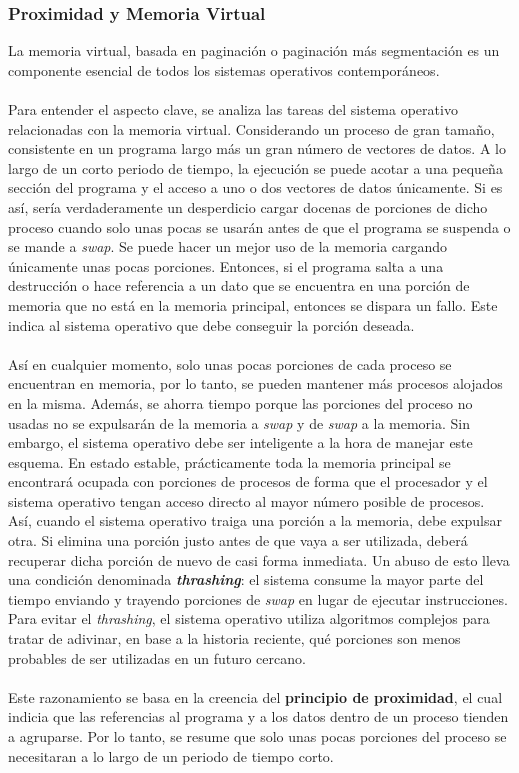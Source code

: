 \documentclass[12pt,a4paper]{article}
\begin{document}
 \subsubsection{Proximidad y Memoria Virtual}
La memoria virtual, basada en paginación o paginación más segmentación es un componente esencial de todos los sistemas operativos contemporáneos.\\\\ 
Para entender el aspecto clave, se analiza las tareas del sistema operativo relacionadas con la memoria virtual. Considerando un proceso de gran tamaño, consistente en un programa largo más un gran número de vectores de datos. A lo largo de un corto periodo de tiempo, la ejecución se puede acotar a una pequeña sección del programa y el acceso a uno o dos vectores de datos únicamente. Si es así, sería verdaderamente un desperdicio cargar docenas de porciones de dicho proceso cuando solo unas pocas se usarán antes de que el programa se suspenda o se mande a \textit{swap}. Se puede hacer un mejor uso de la memoria cargando únicamente unas pocas porciones. Entonces, si el programa salta a una destrucción o hace referencia a un dato que se encuentra en una porción de memoria que no está en la memoria principal, entonces se dispara un fallo. Este indica al sistema operativo que debe conseguir la porción deseada. \\\\ 
Así en cualquier momento, solo unas pocas porciones de cada proceso se encuentran en memoria, por lo tanto, se pueden mantener más procesos alojados en la misma. Además, se ahorra tiempo porque las porciones del proceso no usadas no se expulsarán de la memoria a \textit{swap} y de \textit{swap} a la memoria. Sin embargo, el sistema operativo debe ser inteligente a la hora de manejar este esquema. En estado estable, prácticamente toda la memoria principal se encontrará ocupada con porciones de procesos de forma que el procesador y el sistema operativo tengan acceso directo al mayor número posible de procesos. Así, cuando el sistema operativo traiga una porción a la memoria, debe expulsar otra. Si elimina una porción justo antes de que vaya a ser utilizada, deberá recuperar dicha porción de nuevo de casi forma inmediata. Un abuso de esto lleva una condición denominada \textbf{\textit{thrashing}}: el sistema consume la mayor parte del tiempo enviando y trayendo porciones de \textit{swap} en lugar de ejecutar instrucciones. Para evitar el \textit{thrashing}, el sistema operativo utiliza algoritmos complejos para tratar de adivinar, en base a la historia reciente, qué porciones son menos probables de ser utilizadas en un futuro cercano. \\\\ 
Este razonamiento se basa en la creencia del \textbf{principio de proximidad}, el cual indicia que las referencias al programa y a los datos dentro de un proceso tienden a agruparse. Por lo tanto, se resume que solo unas pocas porciones del proceso se necesitaran a lo largo de un periodo de tiempo corto.
\end{document}
